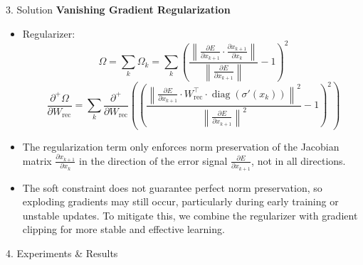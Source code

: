 \documentclass[final]{beamer}
\begin{document}
\begin{frame}[t]
\begin{columns}[t,totalwidth=\textwidth]
\begin{column}{0.35\textwidth}
\begin{block}{3. Solution }
      \textbf{Vanishing Gradient Regularization}
      \begin{itemize}
        \item Regularizer: \[
            \Omega = \sum_k \Omega_k = \sum_k \left(  \frac{ \left\| \frac{\partial E}{\partial x_{k+1}} \cdot \frac{\partial x_{k+1}}{\partial x_k} \right\| }
            { \left\| \frac{\partial E}{\partial x_{k+1}} \right\| } - 1 
            \right)^2
            \]
            \[
            \textstyle
            \frac{\partial^+ \Omega}{\partial W_{\text{rec}}} = \sum_k 
            \frac{\partial^+}{\partial W_{\text{rec}}} \left(
            \left( 
            \frac{ \left\| \frac{\partial E}{\partial x_{k+1}} \cdot W_{\text{rec}}^\top \cdot \operatorname{diag}\left( \sigma'(x_k) \right) \right\|^2 }
            { \left\| \frac{\partial E}{\partial x_{k+1}} \right\|^2 } - 1 
            \right)^2
            \right)
            \]

        \item The regularization term only enforces norm preservation of the Jacobian matrix
                $\frac{\partial x_{k+1}}{\partial x_k}$ in the direction of the error signal 
                $\frac{\partial E}{\partial x_{k+1}}$, not in all directions.
        \item The soft constraint does not guarantee perfect norm preservation, so exploding gradients may still occur, particularly during early training or unstable updates. To mitigate this, we combine the regularizer with gradient clipping for more stable and effective learning.


      \end{itemize}
\end{block}
    \begin{block}{4. Experiments \& Results}


\end{block}
\end{column}
\end{columns}
\end{frame}
\end{document}
